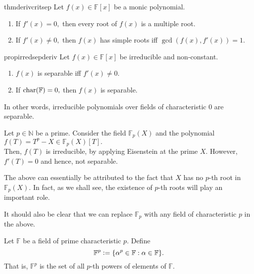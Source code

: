 \begin{restatable}{thm}{derivcritsep}
\label{thm:derivcritsep}
    Let $f(x) \in \mathbb{F}[x]$ be a monic polynomial.
    \begin{enumerate}
         \item If $f'(x) = 0,$ then every root of $f(x)$ is a multiple root.
         \item If $f'(x) \neq 0,$ then $f(x)$ has simple roots iff $\gcd(f(x), f'(x)) = 1.$ \hfill\hyperref[thm:derivcritsep2]{\downsym}
     \end{enumerate} 
\end{restatable}

\begin{restatable}[]{prop}{irredsepderiv}
\label{prop:irredsepderiv}
    Let $f(x) \in \mathbb{F}[x]$ be irreducible and non-constant.
    \begin{enumerate}
         \item $f(x)$ is separable iff $f'(x) \neq 0.$
         \item If $\operatorname{char}(\mathbb{F}) = 0,$ then $f(x)$ is separable. 
     \end{enumerate} 
     In other words, irreducible polynomials over fields of characteristic $0$ are separable. \hfill\hyperref[prop:irredsepderiv2]{\downsym}
\end{restatable}

\begin{ex} \label{ex:FXnotperfect}
    Let $p \in \mathbb{N}$ be a prime. Consider the field $\mathbb{F}_p(X)$ and the polynomial $f(T) = T^p - X \in \mathbb{F}_p(X)[T].$ \\
    Then, $f(T)$ is irreducible, by applying Eisenstein at the prime $X.$ However, $f'(T) = 0$ and hence, not separable.

    The above can essentially be attributed to the fact that $X$ has no $p$-th root in $\mathbb{F}_p(X).$ In fact, as we shall see, the existence of $p$-th roots will play an important role.

    It should also be clear that we can replace $\mathbb{F}_p$ with any field of characteristic $p$ in the above.
\end{ex}

\begin{defn}%
    Let $\mathbb{F}$ be a field of prime characteristic $p.$ Define
    \begin{equation*} 
        \mathbb{F}^p \vcentcolon= \{\alpha^p \in \mathbb{F} : \alpha \in \mathbb{F}\}.
    \end{equation*}
    That is, $\mathbb{F}^p$ is the set of all $p$-th powers of elements of $\mathbb{F}.$
\end{defn}

